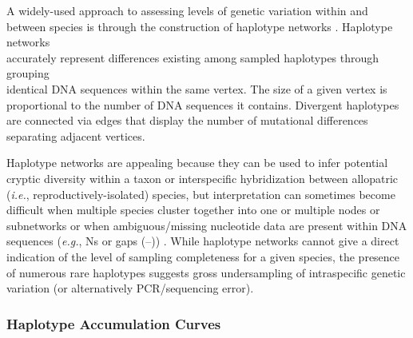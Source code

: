 A widely-used approach to assessing levels of genetic variation within and between species is through the construction of haplotype networks \cite{templeton1992cladistic}. Haplotype networks \\ accurately represent differences existing among sampled haplotypes through grouping \\ identical DNA sequences within the same vertex. The size of a given vertex is proportional to the number of DNA sequences it contains.  Divergent haplotypes are connected via edges that display the number of mutational differences separating adjacent vertices.

 

Haplotype networks are appealing because they can be used to infer potential cryptic diversity within a taxon or interspecific hybridization between allopatric \\ (\textit{i.e.}, reproductively-isolated) species, but interpretation can sometimes become difficult when multiple species cluster together into one or multiple nodes or subnetworks \cite{hanner2011dna, hart2007things, wong2009identifying} or when ambiguous/missing nucleotide data are present within DNA sequences (\textit{e.g.}, Ns or gaps (--)) \cite{joly2007haplotype}. While haplotype networks cannot give a direct indication of the level of sampling completeness for a given species, the presence of numerous rare haplotypes suggests gross undersampling of intraspecific genetic variation (or alternatively PCR/sequencing error).




\subsubsection{Haplotype Accumulation Curves}

